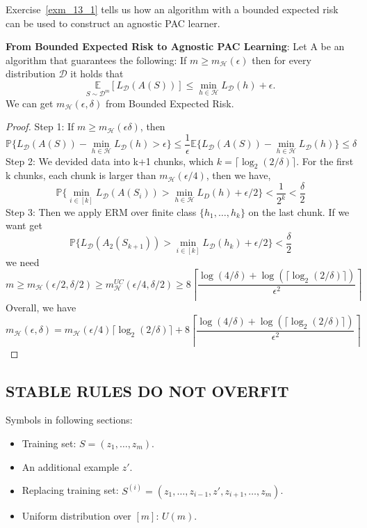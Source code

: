 Exercise~\ref{exm_13_1} tells us how an algorithm with a bounded expected risk can be used to construct an agnostic PAC learner.
\begin{exm}
	\textbf{From Bounded Expected Risk to Agnostic PAC Learning}:
	Let A be an algorithm that guarantees the following: If $ m \ge m_\mathcal{H}(\epsilon) $
	then for every distribution $ \mathcal{D} $ it holds that
	\[ 
		\underset{ S \sim \mathcal{D}^m} {\mathbb{E}} [L_\mathcal{D}(A(S))]
		\le \min\limits_{h\in\mathcal{H}} L_\mathcal{D}(h)+\epsilon.
	\]
	We can get $ m_\mathcal{H}(\epsilon, \delta) $ from Bounded Expected Risk.
	\begin{proof}
		Step 1: If $ m \ge m_\mathcal{H}(\epsilon \delta) $, then
		\[ 
			\mathbb{P} \{ L_\mathcal{D}(A(S)) - \min\limits_{h\in\mathcal{H}} L_\mathcal{D}(h) > \epsilon \}
			\le \frac{1}{\epsilon} 
			\mathbb{E} \{ L_\mathcal{D}(A(S)) - \min\limits_{h\in\mathcal{H}} L_\mathcal{D}(h) \}
			\le \delta
		\]
		Step 2:
		We devided data into k+1 chunks, which $ k = \lceil \log_2(2/\delta) \rceil $.
		For the first k chunks, each chunk is larger than $ m_\mathcal{H}(\epsilon/4) $, 
		then we have,
		\[ 
			\mathbb{P} \{ \min\limits_{i \in [k]} L_\mathcal{D}(A(S_i)) > \min\limits_{h \in \mathcal{H}} L_D (h) + \epsilon/2  \}
			< \frac{1}{2^{k}} < \frac{\delta}{2}
		\]
		Step 3:
		Then we apply ERM over finite class $ \{ h_1, \dots, h_{k} \} $ on the last chunk.
		If we want get
		\[ 
			\mathbb{P} \{ L_\mathcal{D}(A_2(S_{k+1})) > \min\limits_{i \in [k]}L_\mathcal{D}(h_k) + \epsilon/2 \}
			< \frac{\delta}{2} 
		\]
		we need
		\[ 
			m \ge m_\mathcal{H}(\epsilon/2, \delta/2) \ge m^{UC}_{\mathcal{H}}(\epsilon/4, \delta/2)
			\ge 8 \left\lceil
				\frac{\log(4/\delta) + \log(\lceil \log_2(2/\delta) \rceil)}{\epsilon^2}
				\right\rceil
		\]
		Overall, we have
		\[ 
			m_\mathcal{H}(\epsilon, \delta) = 
			m_\mathcal{H}(\epsilon/4)\lceil \log_2(2/\delta) \rceil
			+ 
			8 \left\lceil
				\frac{\log(4/\delta) + \log(\lceil \log_2(2/\delta) \rceil)}{\epsilon^2}
				\right\rceil
		\]
		
	\end{proof}
\end{exm}

\subsection{STABLE RULES DO NOT OVERFIT}

Symbols in following sections:
\begin{itemize}
	\item Training set: $ S = (z_1, \dots, z_m) $.
	\item An additional example $ z' $.
	\item Replacing training set: $ S^{(i)} = (z_1, \dots, z_{i-1}, z', z_{i+1}, \dots, z_m) $.
	\item Uniform distribution over $ [m] $: $ U(m) $.
\end{itemize}

